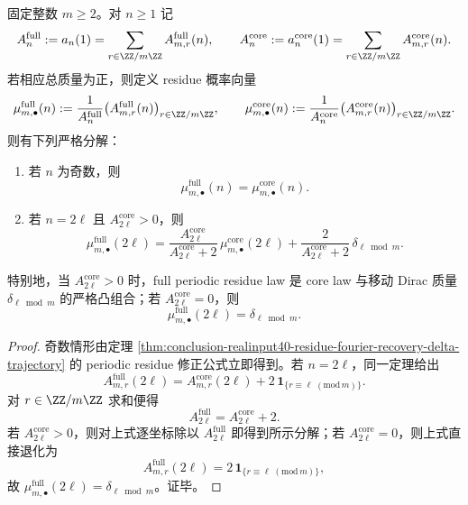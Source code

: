\begin{theorem}\label{thm:conclusion-realinput40-periodic-residue-moving-delta-mixture}
固定整数 \(m\ge 2\)。对 \(n\ge 1\) 记
\[
A_n^{\mathrm{full}}
:=
a_n(1)
=
\sum_{r\in\ZZ/m\ZZ}A_{m,r}^{\mathrm{full}}(n),
\qquad
A_n^{\mathrm{core}}
:=
a_n^{\mathrm{core}}(1)
=
\sum_{r\in\ZZ/m\ZZ}A_{m,r}^{\mathrm{core}}(n).
\]
若相应总质量为正，则定义 residue 概率向量
\[
\mu_{m,\bullet}^{\mathrm{full}}(n)
:=
\frac{1}{A_n^{\mathrm{full}}}
\bigl(A_{m,r}^{\mathrm{full}}(n)\bigr)_{r\in\ZZ/m\ZZ},
\qquad
\mu_{m,\bullet}^{\mathrm{core}}(n)
:=
\frac{1}{A_n^{\mathrm{core}}}
\bigl(A_{m,r}^{\mathrm{core}}(n)\bigr)_{r\in\ZZ/m\ZZ}.
\]
则有下列严格分解：
\begin{enumerate}
  \item 若 \(n\) 为奇数，则
  \[
  \mu_{m,\bullet}^{\mathrm{full}}(n)=\mu_{m,\bullet}^{\mathrm{core}}(n).
  \]
  \item 若 \(n=2\ell\) 且 \(A_{2\ell}^{\mathrm{core}}>0\)，则
  \[
  \boxed{\;
  \mu_{m,\bullet}^{\mathrm{full}}(2\ell)
  =
  \frac{A_{2\ell}^{\mathrm{core}}}{A_{2\ell}^{\mathrm{core}}+2}\,
  \mu_{m,\bullet}^{\mathrm{core}}(2\ell)
  +
  \frac{2}{A_{2\ell}^{\mathrm{core}}+2}\,
  \delta_{\ell \bmod m}.\;}
  \]
\end{enumerate}
特别地，当 \(A_{2\ell}^{\mathrm{core}}>0\) 时，full periodic residue law 是 core law 与移动 Dirac 质量 \(\delta_{\ell\bmod m}\) 的严格凸组合；若 \(A_{2\ell}^{\mathrm{core}}=0\)，则
\[
\mu_{m,\bullet}^{\mathrm{full}}(2\ell)=\delta_{\ell\bmod m}.
\]
\end{theorem}
\begin{proof}
奇数情形由定理 \ref{thm:conclusion-realinput40-residue-fourier-recovery-delta-trajectory} 的 periodic residue 修正公式立即得到。若 \(n=2\ell\)，同一定理给出
\[
A_{m,r}^{\mathrm{full}}(2\ell)
=
A_{m,r}^{\mathrm{core}}(2\ell)
+2\,\mathbf 1_{\{r\equiv \ell\;(\mathrm{mod}\,m)\}}.
\]
对 \(r\in\ZZ/m\ZZ\) 求和便得
\[
A_{2\ell}^{\mathrm{full}}=A_{2\ell}^{\mathrm{core}}+2.
\]
若 \(A_{2\ell}^{\mathrm{core}}>0\)，则对上式逐坐标除以 \(A_{2\ell}^{\mathrm{full}}\) 即得到所示分解；若 \(A_{2\ell}^{\mathrm{core}}=0\)，则上式直接退化为
\[
A_{m,r}^{\mathrm{full}}(2\ell)=2\,\mathbf 1_{\{r\equiv \ell\;(\mathrm{mod}\,m)\}},
\]
故 \(\mu_{m,\bullet}^{\mathrm{full}}(2\ell)=\delta_{\ell\bmod m}\)。证毕。
\end{proof}

